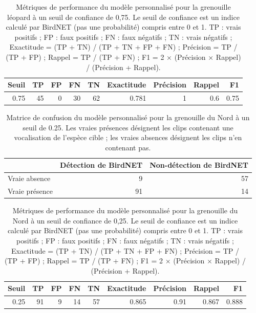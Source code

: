 \begin{table}[H]
\centering
\caption{Métriques de performance du modèle personnalisé pour la grenouille léopard à un seuil de confiance de 0,75. Le seuil de confiance est un indice calculé par BirdNET (pas une probabilité) compris entre 0 et 1. TP : vrais positifs ; FP : faux positifs ; FN : faux négatifs ; TN : vrais négatifs ; Exactitude = (TP + TN) / (TP + TN + FP + FN) ; Précision = TP / (TP + FP) ; Rappel = TP / (TP + FN) ; F1 = 2 × (Précision × Rappel) / (Précision + Rappel).}
\label{tab:tab_metrics_pipiens_075}
\begin{tabular}{rrrrrrrrr}
  \hline
Seuil & TP & FP & FN & TN & Exactitude & Précision & Rappel & F1 \\
  \hline
0.75 & 45 & 0 & 30 & 62 & 0.781 & 1 & 0.6 & 0.75 \\
  \hline
\end{tabular}
\end{table}

\begin{table}[H]
\centering
\caption{Matrice de confusion du modèle personnalisé pour la grenouille du Nord à un seuil de 0.25. Les vraies présences désignent les clips contenant une vocalisation de l'espèce cible ; les vraies absences désignent les clips n'en contenant pas.}
\label{tab:tab_confusion_septentrionalis_025}
\begin{tabular}{lrr}
  \hline
 & Détection de BirdNET & Non-détection de BirdNET \\
  \hline
Vraie absence  &  9 & 57 \\
Vraie présence & 91 & 14 \\
  \hline
\end{tabular}
\end{table}

\begin{table}[H]
\centering
\caption{Métriques de performance du modèle personnalisé pour la grenouille du Nord à un seuil de confiance de 0,25. Le seuil de confiance est un indice calculé par BirdNET (pas une probabilité) compris entre 0 et 1. TP : vrais positifs ; FP : faux positifs ; FN : faux négatifs ; TN : vrais négatifs ; Exactitude = (TP + TN) / (TP + TN + FP + FN) ; Précision = TP / (TP + FP) ; Rappel = TP / (TP + FN) ; F1 = 2 × (Précision × Rappel) / (Précision + Rappel).}
\label{tab:tab_metrics_septentrionalis_025}
\begin{tabular}{rrrrrrrrr}
  \hline
Seuil & TP & FP & FN & TN & Exactitude & Précision & Rappel & F1 \\
  \hline
0.25 & 91 & 9 & 14 & 57 & 0.865 & 0.91 & 0.867 & 0.888 \\
  \hline
\end{tabular}
\end{table}

